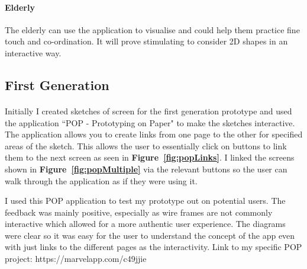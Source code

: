 \documentclass[11pt]{article}
\begin{document}
            \paragraph{Elderly}
            The elderly can use the application to visualise and could help them practice fine touch and co-ordination. It will prove stimulating to consider 2D shapes in an interactive way. 
            \clearpage
            
            \subsection{First Generation}
                    
                \paragraph{}
                Initially I created sketches of screen for the first generation prototype and used the application ``POP - Prototyping on Paper" \cite{POP} to make the sketches interactive. The application allows you to create links from one page to the other for specified areas of the sketch. This allows the user to essentially click on buttons to link them to the next screen as seen in \textbf{Figure~\ref{fig:popLinks}}. I linked the screens shown in  \textbf{Figure~\ref{fig:popMultiple}} via the relevant buttons so the user can walk through the application as if they were using it.
                
                I used this POP application to test my prototype out on potential users. The feedback was mainly positive, especially as wire frames are not commonly interactive which allowed for a more authentic user experience. The diagrams were clear so it was easy for the user to understand the concept of the app even with just links to the different pages as the interactivity.
                Link to my specific POP project: https://marvelapp.com/c49jjie
                
\end{document}
